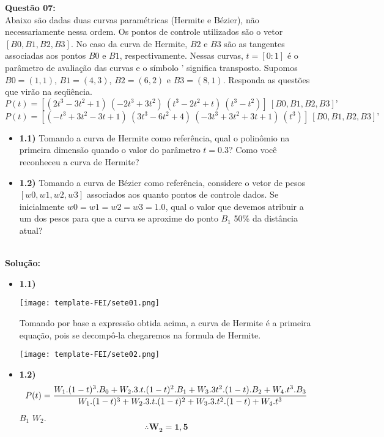 \documentclass[a4paper, 12pt]{article}
\begin{document}
\vspace{1cm}
\noindent\textbf{Questão 07:}\\
Abaixo são dadas duas curvas paramétricas (Hermite e Bézier), não necessariamente nessa ordem.
Os pontos de controle utilizados são o vetor $[B0, B1, B2, B3]$. No caso da curva de Hermite, $B2$ e $B3$
são as tangentes associadas aos pontos $B0$ e $B1$, respectivamente. Nessas curvas, $t = [0:1]$ é o
parâmetro de avaliação das curvas e o símbolo $’$ significa transposto. Supomos $B0 = (1,1)$, $B1 = (4,3)$,
$B2 = (6,2)$ e $B3 = (8,1)$. Responda as questões que virão na seqüência.
$$P(t) = [(2t^3-3t^2+1) \ (-2t^3+3t^2) \ (t^3-2t^2+t) \ (t^3-t^2) ] \ [B0, B1, B2, B3]’$$
$$P(t) = [(-t^3+3t^2-3t+1) \ (3t^3-6t^2+4) \ (-3t^3+3t^2+3t+1) \ (t^3)] \ [B0, B1, B2, B3]’$$
\begin{itemize}
\item \textbf{1.1)} Tomando a curva de Hermite como referência, qual o polinômio na primeira dimensão quando o
valor do parâmetro $t = 0.3$? Como você reconheceu a curva de Hermite?
\item \textbf{1.2)} Tomando a curva de Bézier como referência, considere o vetor de pesos $[w0, w1, w2, w3]$
associados aos quanto pontos de controle dados. Se inicialmente $w0 = w1 = w2 = w3 = 1.0$, qual o
valor que devemos atribuir a um dos pesos para que a curva se aproxime do ponto $B_1$ 50\% da
distância atual?
\end{itemize}
\\
\noindent\textbf{Solução:}
\begin{itemize}
\item\textbf{1.1)}
\begin{center}
    \texttt{[image: template-FEI/sete01.png]}
\end{center}
Tomando por base a expressão obtida acima, a curva de Hermite é a primeira equação, pois se decompô-la chegaremos na formula de Hermite.
\begin{center}
    \texttt{[image: template-FEI/sete02.png]}
\end{center}
\vspace{0.5cm}
\item\textbf{1.2)}
\[
	P(t)=\frac{W_1.(1-t)^3.B_0+W_2.3.t.(1-t)^2.B_1+W_3.3t^2.(1-t).B_2+W_4.t^3.B_3}{W_1.(1-t)^3+W_2.3.t.(1-t)^2+W_3.3.t^2.(1-t)+W_4.t^3}
	\vspace{0.5cm}
\]
 $B_1$  $W_2$.
\\
\[\therefore \mathbf{W_2 = 1,5}\]
\end{itemize}
\end{document}
